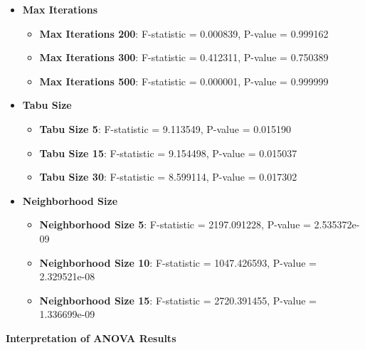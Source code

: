 \documentclass[
]{article}
\begin{document}
    \begin{itemize}
        \item \textbf{Max Iterations}
        \begin{itemize}
            \item \textbf{Max Iterations 200}: F-statistic = 0.000839, P-value = 0.999162
            \item \textbf{Max Iterations 300}: F-statistic = 0.412311, P-value = 0.750389
            \item \textbf{Max Iterations 500}: F-statistic = 0.000001, P-value = 0.999999
        \end{itemize}
        \item \textbf{Tabu Size}
        \begin{itemize}
            \item \textbf{Tabu Size 5}: F-statistic = 9.113549, P-value = 0.015190
            \item \textbf{Tabu Size 15}: F-statistic = 9.154498, P-value = 0.015037
            \item \textbf{Tabu Size 30}: F-statistic = 8.599114, P-value = 0.017302
        \end{itemize}
        \item \textbf{Neighborhood Size}
        \begin{itemize}
            \item \textbf{Neighborhood Size 5}: F-statistic = 2197.091228, P-value = 2.535372e-09
            \item \textbf{Neighborhood Size 10}: F-statistic = 1047.426593, P-value = 2.329521e-08
            \item \textbf{Neighborhood Size 15}: F-statistic = 2720.391455, P-value = 1.336699e-09
        \end{itemize}
    \end{itemize}

    \textbf{Interpretation of ANOVA Results}
\end{document}
